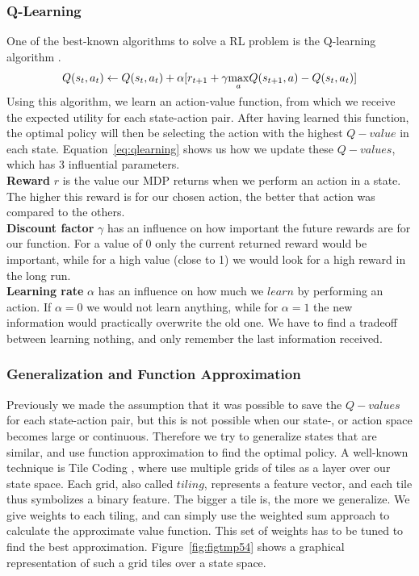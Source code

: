 \documentclass[a4paper,12pt]{article}
\begin{document}
\subsubsection{Q-Learning}
One of the best-known algorithms to solve a RL problem is the Q-learning algorithm \cite{sutton1998rl}.
\begin{equation}
Q(s_{t}, a_{t}) \gets Q(s_{t}, a_{t}) + \alpha[r_{t+1} + \gamma\smash{\displaystyle\max_{a}} Q(s_{t+1}, a) - Q(s_{t}, a_{t})]
\label{eq:qlearning}
\end{equation}
Using this algorithm, we learn an action-value function, from which we receive the expected utility for each state-action pair. After having learned this function, the optimal policy will then be selecting the action with the highest $Q-value$ in each state. Equation~\ref{eq:qlearning} shows us how we update these $Q-values$, which has 3 influential parameters.\\
\textbf{Reward} $r$ is the value our MDP returns when we perform an action in a state. The higher this reward is for our chosen action, the better that action was compared to the others.\\
\textbf{Discount factor} $\gamma$ has an influence on how important the future rewards are for our function. For a value of 0 only the current returned reward would be important, while for a high value (close to 1) we would look for a high reward in the long run.\\
\textbf{Learning rate} $\alpha$ has an influence on how much we $learn$ by performing an action. If $\alpha=0$ we would not learn anything, while for $\alpha=1$ the new information would practically overwrite the old one. We have to find a tradeoff between learning nothing, and only remember the last information received.

\subsubsection{Generalization and Function Approximation}
Previously we made the assumption that it was possible to save the $Q-values$ for each state-action pair, but this is not possible when our state-, or action space becomes large or continuous. Therefore we try to generalize states that are similar, and use function approximation to find the optimal policy. A well-known technique is Tile Coding \cite{sutton1998rl}, where use multiple grids of tiles as a layer over our state space. Each grid, also called $tiling$, represents a feature vector, and each tile thus symbolizes a binary feature. The bigger a tile is, the more we generalize. We give weights to each tiling, and can simply use the weighted sum approach to calculate the approximate value function. This set of weights has to be tuned to find the best approximation. Figure~\ref{fig:figtmp54} shows a graphical representation of such a grid tiles over a state space.
\end{document}
